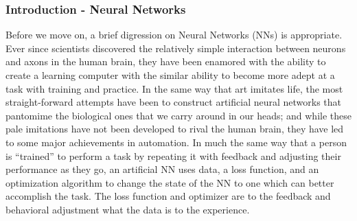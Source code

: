 \documentclass[11pt,aspectratio=169]{beamer}
\begin{document}
    \begin{frame}
        \frametitle{Introduction - Neural Networks}
        Before we move on, a brief digression on Neural Networks (NNs) is appropriate. Ever since
        scientists discovered the relatively simple interaction between neurons and axons in 
        the human brain, they have been enamored with the ability to create a learning computer 
        with the similar ability to become more adept at a task with training and practice. 
        In the same way that art imitates life, the most straight-forward attempts have been 
        to construct artificial neural networks that pantomime the biological ones that we carry 
        around in our heads; and while these pale imitations have not been developed to rival the 
        human brain, they have led to some major achievements in automation. In much the same 
        way that a person is ``trained'' to perform a task by repeating it with feedback and 
        adjusting their performance as they go, an artificial NN uses data, a loss function, and 
        an optimization algorithm to change the state of the NN to one which can better accomplish 
        the task. The loss function and optimizer are to the feedback and behavioral adjustment 
        what the data is to the experience. 
    \end{frame}
\end{document}
